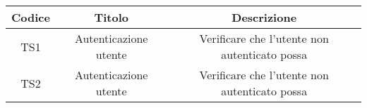 \begin{center}
	\begin{longtable}{|c|c|c|}
	\hline
	\rowcolor{lighter-grayer}
	\textbf{Codice} & \textbf{Titolo} & \textbf{Descrizione} \\
	\hline
	\endfirsthead



	\hline
	TS1 & Autenticazione utente & Verificare che l'utente non autenticato possa  \\
	TS2 & Autenticazione utente & Verificare che l'utente non autenticato possa  \\

	\hline

	\end{longtable}
\end{center}

